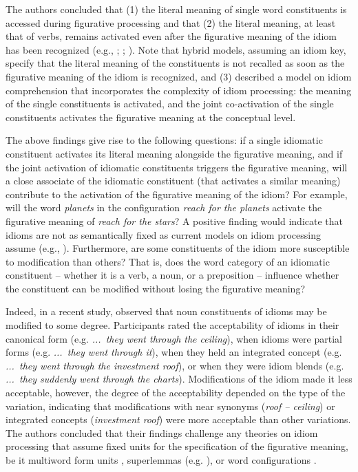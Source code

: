 \documentclass[output=paper]{langsci/langscibook}
\begin{document}
The authors concluded that (1) the literal meaning of single word constituents is accessed during figurative processing and that (2) the literal meaning, at least that of verbs, remains activated even after the figurative meaning of the idiom has been recognized (e.g., \citealt{cacciari:1988}; \citealt{cutting:1997}; \citealt{sprenger:2006}). Note that hybrid models, assuming an idiom key, specify that the literal meaning of the constituents is not recalled as soon as the figurative meaning of the idiom is recognized, and (3) described a model on idiom comprehension that incorporates the complexity of idiom processing: the meaning of the single constituents is activated, and the joint co-activation of the single constituents activates the figurative meaning at the conceptual level.\largerpage

The above findings give rise to the following questions: if a single idiomatic constituent activates its literal meaning alongside the figurative meaning, and if the joint activation of idiomatic constituents triggers the figurative meaning, will a close associate of the idiomatic constituent (that activates a similar meaning) contribute to the activation of the figurative meaning of the idiom? For example, will the word \textit{planets} in the configuration \textit{reach for the planets} activate the figurative meaning of \textit{reach for the stars}? A positive finding would indicate that idioms are not as semantically fixed as current models on idiom processing assume (e.g., \citealt{sprenger:2006}). Furthermore, are some constituents of the idiom more susceptible to modification than others? That is, does the word category of an idiomatic constituent -- whether it is a verb, a noun, or a preposition -- influence whether the constituent can be modified without losing the figurative meaning?

Indeed, in a recent study, \citet{geeraert:2017} observed that noun constituents of idioms may be modified to some degree. Participants rated the acceptability of idioms in their canonical form (e.g. \textit{...~they went through the ceiling}), when idioms were partial forms (e.g. \textit{...~they went through it}), when they held an integrated concept (e.g. \textit{...~they went through the investment roof}), or when they were idiom blends (e.g. \textit{...~they suddenly went through the charts}). Modifications of the idiom made it less acceptable, however, the degree of the acceptability depended on the type of the variation, indicating that modifications with near synonyms (\textit{roof – ceiling}) or integrated concepts (\textit{investment roof}) were more acceptable than other variations. The authors concluded that their findings challenge any theories on idiom processing that assume fixed units for the specification of the figurative meaning, be it multiword form units \citep{bobrow:1973}, superlemmas (e.g. \citealt{sprenger:2006}), or word configurations \citep{cacciari:1988}.
\end{document}
